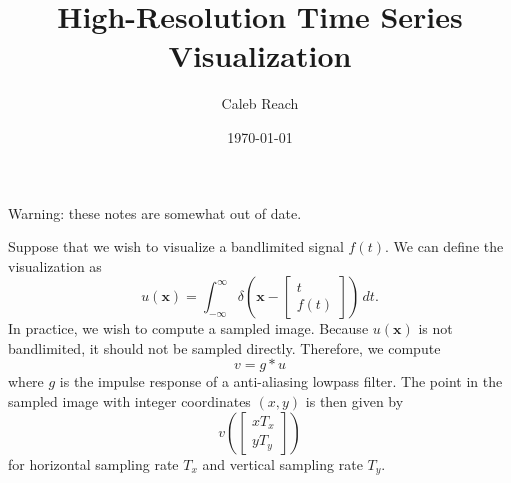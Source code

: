 \documentclass{article}
\title{High-Resolution Time Series Visualization}
\author{Caleb Reach}
\date{\today}
\let\V\boldsymbol
\begin{document}
\maketitle
Warning: these notes are somewhat out of date.

Suppose that we wish to visualize a bandlimited signal $f(t)$.  We can define the visualization as
\[
u(\V x) = \int_{-\infty}^{\infty} \delta\left(\V x - \begin{bmatrix}t\\f(t)\end{bmatrix}\right)\,dt.
\]
In practice, we wish to compute a sampled image.  Because $u(\V x)$ is not bandlimited, it should not be sampled directly.  Therefore, we compute
\[
v = g*u
\]
where $g$ is the impulse response of a anti-aliasing lowpass filter.  The point in the sampled image with integer coordinates $(x,y)$ is then given by
\[
v\left(\begin{bmatrix}xT_x\\yT_y\end{bmatrix}\right)
\]
for horizontal sampling rate $T_x$ and vertical sampling rate $T_y$.
\end{document}
